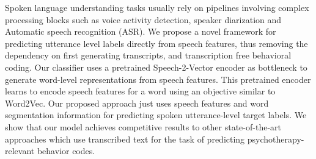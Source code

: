 Spoken language understanding tasks usually rely on pipelines involving complex processing blocks such as voice activity detection, speaker diarization and Automatic speech recognition (ASR). We propose a novel framework for predicting utterance level labels directly from speech features, thus removing the dependency on first generating transcripts, and transcription free behavioral coding. Our classifier uses a pretrained Speech-2-Vector encoder as bottleneck to generate word-level representations from speech features. This pretrained encoder learns to encode speech features for a word using an objective similar to Word2Vec. Our proposed approach just uses speech features and word segmentation information for predicting spoken utterance-level target labels. We show that our model achieves competitive results to other state-of-the-art approaches which use transcribed text for the task of predicting psychotherapy-relevant behavior codes.

